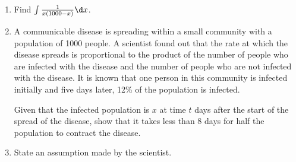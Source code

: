 \begin{problem}
    \begin{enumerate}
        \item Find $\int\frac1{x(1000-x)} \d x$.
        \item A communicable disease is spreading within a small community with a population of 1000 people. A scientist found out that the rate at which the disease spreads is proportional to the product of the number of people who are infected with the disease and the number of people who are not infected with the disease. It is known that one person in this community is infected initially and five days later, 12\% of the population is infected.

        Given that the infected population is $x$ at time $t$ days after the start of the spread of the disease, show that it takes less than 8 days for half the population to contract the disease.
        \item State an assumption made by the scientist.
    \end{enumerate}
\end{problem}
